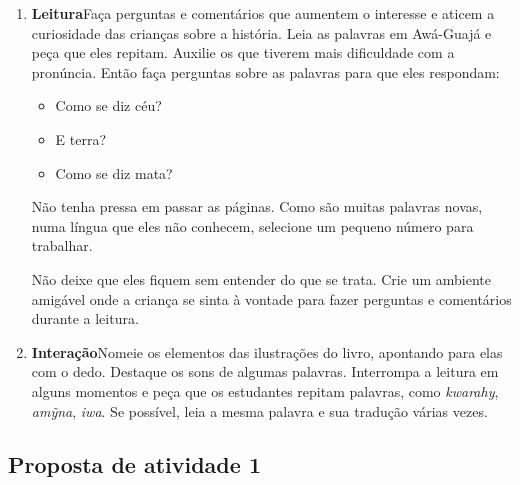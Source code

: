 \documentclass[11pt]{extarticle}
\begin{document}
\begin{enumerate}
\item \textbf{Leitura}\quad Faça perguntas e comentários que aumentem o 
interesse e aticem a curiosidade das crianças sobre a história. Leia 
as palavras em Awá-Guajá e peça que eles repitam. Auxilie os que tiverem
mais dificuldade com a pronúncia. Então faça perguntas sobre as palavras
para que eles respondam:

\begin{itemize}
\item Como se diz céu?
\item E terra?
\item Como se diz mata?
\end{itemize}

Não tenha pressa em passar as páginas. Como são muitas palavras novas,
numa língua que eles não conhecem, selecione um pequeno número para
trabalhar. 

Não deixe que eles fiquem sem entender do que se trata. Crie 
um ambiente amigável onde a criança se sinta à vontade para fazer 
perguntas e comentários durante a leitura.


\item \textbf{Interação}\quad Nomeie os elementos das ilustrações 
do livro, apontando para elas com o dedo. Destaque os sons de algumas 
palavras. Interrompa a leitura em alguns momentos e peça que 
os estudantes repitam palavras, como \textit{kwarahy}, \textit{amỹna}, \textit{iwa}. Se possível, 
leia a mesma palavra e sua tradução várias vezes.
\end{enumerate}


\subsection{Proposta de atividade 1}

 
\end{document}
